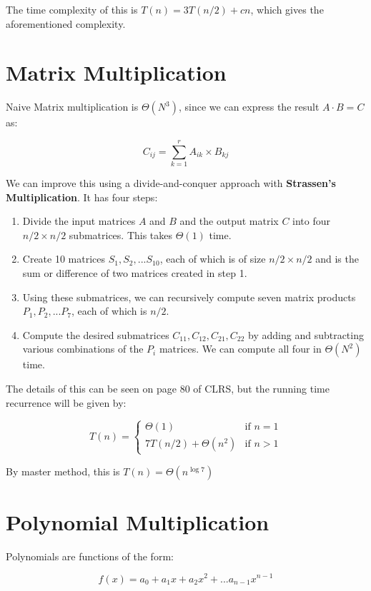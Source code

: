 \documentclass[12pt,letterpaper]{article}
\theoremstyle{definition}
\begin{document}
The time complexity of this is $T(n) = 3T(n/2) + cn$, which gives the aforementioned complexity.

\section{Matrix Multiplication}

Naive Matrix multiplication is $\Theta(N^3)$, since we can express the result $A \cdot B  = C$ as:

\[C_{ij} = \sum_{k=1}^{r}A_{ik} \times B_{kj}\]

We can improve this using a divide-and-conquer approach with \textbf{Strassen's Multiplication}. It has four steps:

\begin{enumerate}
  \item Divide the input matrices $A$ and $B$ and the output matrix $C$ into four $n/2 \times n/2$ submatrices. This takes $\Theta(1)$ time.
  \item Create 10 matrices $S_1,S_2,...S_{10}$, each of which is of size $n/2 \times n/2$ and is the sum or difference of two matrices created in step 1.
  \item Using these submatrices, we can recursively compute seven matrix products $P_1,P_2,...P_7$, each of which is $n/2$.
  \item Compute the desired submatrices $C_{11},C_{12},C_{21},C_{22}$ by adding and subtracting various combinations of the $P_i$ matrices. We can compute all four in $\Theta(N^2)$ time.
\end{enumerate}

The details of this can be seen on page 80 of CLRS, but the running time recurrence will be given by:

\[T(n) = \begin{cases}
  \Theta(1) & \text{if } n = 1 \\
  7T(n/2) + \Theta(n^2) & \text{if } n > 1
\end{cases}\]

By master method, this is $T(n) = \Theta(n^{\log7})$

\section{Polynomial Multiplication}

Polynomials are functions of the form:

\[f(x) = a_0 + a_1x + a_2x^2 + ... a_{n-1}x^{n-1}\]
\end{document}
